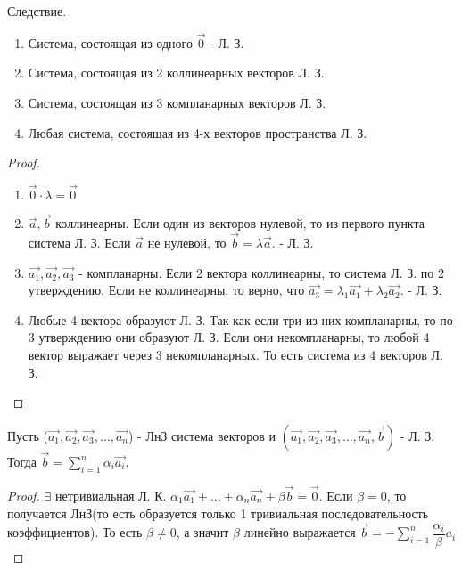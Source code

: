 	\begin{proposition}
		Следствие. 
		\begin{enumerate}
			\item Система, состоящая из одного $\vec{0}$ - Л. З. 
			\item Система, состоящая из 2 коллинеарных векторов Л. З.
			\item Система, состоящая из 3 компланарных векторов Л. З.
			\item Любая система, состоящая из 4-х векторов пространства Л. З.
		\end{enumerate}
	\end{proposition}
	\begin{proof}
		\begin{enumerate}
			\item $\vec{0}\cdot\lambda = \vec{0}$
			\item $\vec{a}, \vec{b}$ коллинеарны. Если один из векторов нулевой, то из первого пункта система Л. З. Если $\vec{a}$ не нулевой, то $\vec{b} = \lambda\vec{a}$. - Л. З.
			\item $\vec{a_1}, \vec{a_2}, \vec{a_3}$ - компланарны. Если 2 вектора коллинеарны, то система Л. З. по 2 утверждению. Если не коллинеарны, то верно, что $\vec{a_3} = \lambda_1\vec{a_1} + \lambda_2\vec{a_2}$. - Л. З.
			\item Любые 4 вектора образуют Л. З. Так как если три из них компланарны, то по 3 утверждению они образуют Л. З. Если они некомпланарны, то любой 4 вектор выражает через 3 некомпланарных. То есть система из 4 векторов Л. З.
		\end{enumerate}
	\end{proof}
	\begin{proposition}
		Пусть ($\vec{a_1}, \vec{a_2}, \vec{a_3}, \ldots, \vec{a_n}$) - ЛнЗ система векторов и $(\vec{a_1}, \vec{a_2}, \vec{a_3}, \ldots, \vec{a_n}, \vec{b})$ - Л. З. Тогда $\vec{b} = \sum_{i=1}^{n}\alpha_i\vec{a_i}$.
	\end{proposition}
	\begin{proof}
		$\exists$ нетривиальная Л. К. \(\alpha_1\vec{a_1}+\ldots+\alpha_n\vec{a_n}+\beta\vec{b} = \vec{0}\). Если $\beta = 0$, то получается ЛнЗ(то есть образуется только 1 тривиальная последовательность коэффициентов). То есть $\beta\ne0$, а значит $\beta$ линейно выражается $\vec{b} = -\sum_{i=1}^{n}\dfrac{\alpha_i}{\beta}a_i$
	\end{proof}
